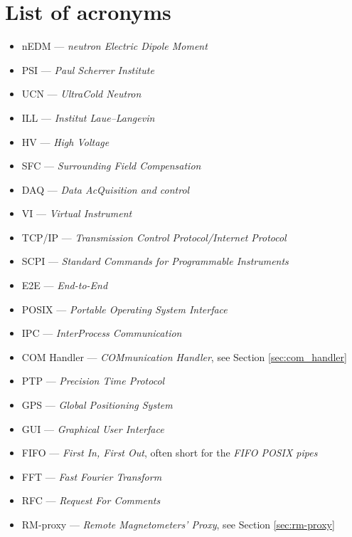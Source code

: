 \chapter*{List of acronyms}

\begin{itemize}
	\item nEDM --- \textit{neutron Electric Dipole Moment}
	\item PSI --- \textit{Paul Scherrer Institute}
	\item UCN --- \textit{UltraCold Neutron}
	\item ILL --- \textit{Institut Laue–Langevin}
	\item HV --- \textit{High Voltage}
	\item SFC --- \textit{Surrounding Field Compensation}
	\item DAQ --- \textit{Data AcQuisition and control}
	\item VI --- \textit{Virtual Instrument}
	\item TCP/IP --- \textit{Transmission Control Protocol/Internet Protocol}
	\item SCPI --- \textit{Standard Commands for Programmable Instruments}
	\item E2E --- \textit{End-to-End}
	\item POSIX --- \textit{Portable Operating System Interface}
	\item IPC --- \textit{InterProcess Communication}
	\item COM Handler --- \textit{COMmunication Handler}, see Section \ref{sec:com_handler}
	\item PTP --- \textit{Precision Time Protocol}
	\item GPS --- \textit{Global Positioning System}
	\item GUI --- \textit{Graphical User Interface}
	\item FIFO --- \textit{First In, First Out}, often short for the \textit{FIFO POSIX pipes}
	\item FFT --- \textit{Fast Fourier Transform}
	\item RFC --- \textit{Request For Comments}
	\item RM-proxy --- \textit{Remote Magnetometers' Proxy}, see Section \ref{sec:rm-proxy}
\end{itemize}